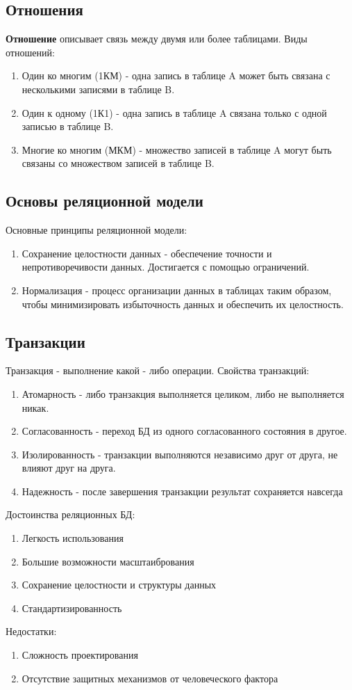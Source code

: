 \documentclass[]{article}
\begin{document}
\subsection{Отношения}
\textbf{Отношение} описывает связь между двумя или более таблицами. 
Виды отношений:
\begin{enumerate}
\item Один ко многим (1КМ) - одна запись в таблице A может быть связана с несколькими записями в таблице B.
\item Один к одному (1К1) - одна запись в таблице A связана только с одной записью в таблице B.
\item Многие ко многим (МКМ) - множество записей в таблице A могут быть связаны со множеством записей в таблице B. 
\end{enumerate}

\subsection{Основы реляционной модели}
Основные принципы реляционной модели:
\begin{enumerate}
\item Сохранение целостности данных - обеспечение точности и непротиворечивости данных. Достигается с помощью ограничений.
\item Нормализация - процесс организации данных в таблицах таким образом, чтобы минимизировать избыточность данных и обеспечить их целостность.  
\end{enumerate}

\subsection{Транзакции}
Транзакция - выполнение какой - либо операции. 
\newline
Свойства транзакций: 
\begin{enumerate}
\item Атомарность - либо транзакция выполняется целиком, либо не выполняется никак. 
\item Согласованность - переход БД из одного согласованного состояния в другое.
\item Изолированность - транзакции выполняются независимо друг от друга, не влияют друг на друга.
\item Надежность - после завершения транзакции результат сохраняется навсегда
\end{enumerate}
Достоинства реляционных БД: 
\begin{enumerate}
\item Легкость использования
\item Большие возможности масштаибрования 
\item Сохранение целостности и структуры данных
\item Стандартизированность
\end{enumerate}
Недостатки: 
\begin{enumerate}
\item Сложность проектирования
\item Отсутствие защитных механизмов от человеческого фактора
\end{enumerate}
\end{document}
